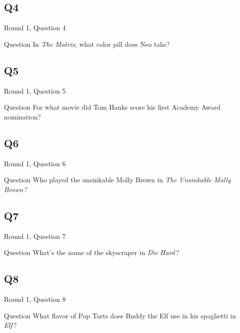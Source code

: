 \documentclass[11pt]{beamer}
\begin{document}
\subsection*{Q4}
\begin{frame}[t]{Round 1, Question 4}
  \vspace{2em}
  \begin{block}{Question}
    In \emph{The Matrix}, what color pill does Neo take?
  \end{block}
\end{frame}


\subsection*{Q5}
\begin{frame}[t]{Round 1, Question 5}
  \vspace{2em}
  \begin{block}{Question}
    For what movie did Tom Hanks score his first Academy Award nomination?
  \end{block}
\end{frame}


\subsection*{Q6}
\begin{frame}[t]{Round 1, Question 6}
  \vspace{2em}
  \begin{block}{Question}
    Who played the unsinkable Molly Brown in \emph{The Unsinkable Molly Brown}\,?
  \end{block}
\end{frame}


\subsection*{Q7}
\begin{frame}[t]{Round 1, Question 7}
  \vspace{2em}
  \begin{block}{Question}
    What's the name of the skyscraper in \emph{Die Hard}\,?
  \end{block}
\end{frame}


\subsection*{Q8}
\begin{frame}[t]{Round 1, Question 8}
  \vspace{2em}
  \begin{block}{Question}
    What flavor of Pop Tarts does Buddy the Elf use in his spaghetti in \emph{Elf}\,?
  \end{block}
\end{frame}
\end{document}
